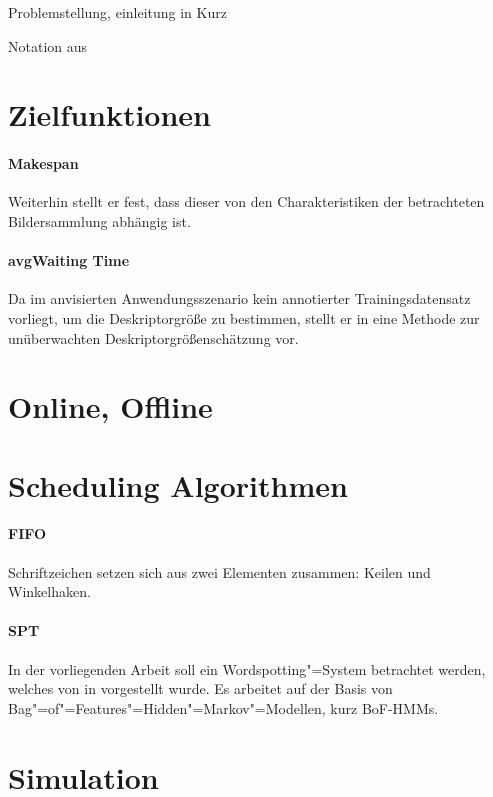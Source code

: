Problemstellung, einleitung in Kurz

Notation aus

\section{Zielfunktionen}

\paragraph{Makespan}

Weiterhin stellt er fest, dass dieser von den Charakteristiken der betrachteten Bildersammlung abhängig ist. 
\paragraph{avgWaiting Time}
Da im anvisierten Anwendungsszenario kein annotierter Trainingsdatensatz vorliegt, um die Deskriptorgröße zu bestimmen, 
stellt er in \cite[Kap. 5.4.1]{LDiss} eine Methode zur unüberwachten Deskriptorgrößenschätzung vor.

\section{Online, Offline}

\section{Scheduling Algorithmen}

\paragraph{FIFO}
Schriftzeichen setzen sich aus zwei Elementen zusammen: Keilen und Winkelhaken. 

\paragraph{SPT}
In der vorliegenden Arbeit soll ein Wordspotting"=System betrachtet werden, welches von 
in \cite{LDiss} vorgestellt wurde. Es arbeitet auf der Basis von Bag"=of"=Features"=Hidden"=Markov"=Modellen, kurz
BoF-HMMs.



\section{Simulation}


